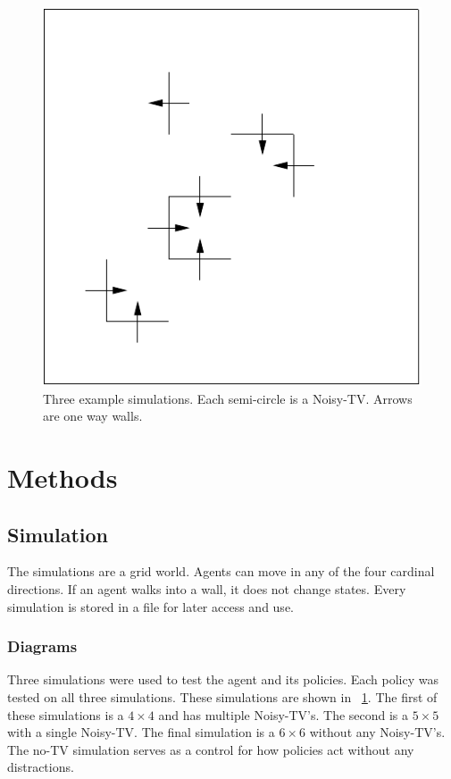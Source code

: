 \documentclass[12pt]{thesis}
\begin{document}
\begin{figure}
\begin{center}
	  \includegraphics[scale=0.75]{"images/No-TV.pdf"}
	\end{center}
	\caption{Three example simulations. Each semi-circle is a Noisy-TV. Arrows are one way walls.}
	\label{Fig:Sim}
\end{figure}

\chapter{Methods}
\section{Simulation}
The simulations are a grid world. Agents can move in any of the four cardinal directions. If an agent walks into a wall, it does not change states. Every simulation is stored in a file for later access and use.
\subsection{Diagrams}
Three simulations were used to test the agent and its policies. Each policy was tested on all three simulations. These simulations are shown in \figurename~\ref{Fig:Sim}. The first of these simulations is a $4\times4$ and has multiple Noisy-TV's. The second is a $5\times5$ with a single Noisy-TV. The final simulation is a $6\times6$ without any Noisy-TV's. The no-TV simulation serves as a control for how policies act without any distractions.
\end{document}
